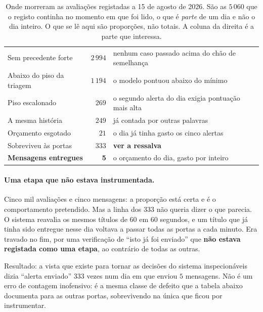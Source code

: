 \begin{table}[!htbp]
\caption[O funil de um dia real]{Onde morreram as avaliações registadas a 15 de agosto de 2026.
São as $5\,060$ que o registo continha no momento em que foi lido, o que é \emph{parte} de um dia e
não o dia inteiro. O que se lê aqui são proporções, não totais. A coluna da direita é a parte que
interessa.}
\label{tab:sis_funil}
\centering
\small
\begin{tabular}{L{0.30\textwidth} r L{0.42\textwidth}}
\toprule
{} &  &  \\
\midrule
Sem precedente forte & $2\,994$ & nenhum caso passado acima do chão de semelhança \\
Abaixo do piso da triagem & $1\,194$ & o modelo pontuou abaixo do mínimo \\
Piso escalonado & $269$ & o segundo alerta do dia exigia pontuação mais alta \\
A mesma história & $249$ & já contada por outras palavras \\
Orçamento esgotado & $21$ & o dia já tinha gasto os cinco alertas \\
Sobreviveu às portas & $333$ & \textbf{ver a ressalva} \\
\midrule
\textbf{Mensagens entregues} & \textbf{5} & o orçamento do dia, gasto por inteiro \\
\bottomrule
\end{tabular}
\end{table}

\paragraph{Uma etapa que não estava instrumentada.}
Cinco mil avaliações e cinco mensagens: a proporção está certa e é o comportamento pretendido. Mas
a linha dos $333$ não queria dizer o que parecia. O sistema reavalia os mesmos títulos de $60$ em
$60$ segundos, e um título que já tinha sido entregue nesse dia voltava a passar todas as portas
a cada minuto. Era travado no fim, por uma verificação de ``isto já foi enviado'' que
\textbf{não estava registada como uma etapa}, ao contrário de todas as outras.

Resultado: a vista que existe para tornar as decisões do sistema inspecionáveis dizia
``alerta enviado'' $333$ vezes num dia em que enviou $5$ mensagens. Não é um erro de contagem
inofensivo: é a mesma classe de defeito que a tabela abaixo documenta para as outras portas,
sobrevivendo na única que ficou por instrumentar.

